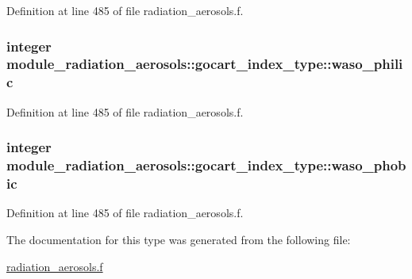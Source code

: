 Definition at line 485 of file radiation\+\_\+aerosols.\+f.

\subsubsection[{\texorpdfstring{waso\+\_\+philic}{waso_philic}}]{\setlength{\rightskip}{0pt plus 5cm}integer module\+\_\+radiation\+\_\+aerosols\+::gocart\+\_\+index\+\_\+type\+::waso\+\_\+philic\hspace{0.3cm}{\ttfamily [private]}}\hypertarget{structmodule__radiation__aerosols_1_1gocart__index__type_a05425c83c167f7820a126c72e561a4da}{}\label{structmodule__radiation__aerosols_1_1gocart__index__type_a05425c83c167f7820a126c72e561a4da}


Definition at line 485 of file radiation\+\_\+aerosols.\+f.

\subsubsection[{\texorpdfstring{waso\+\_\+phobic}{waso_phobic}}]{\setlength{\rightskip}{0pt plus 5cm}integer module\+\_\+radiation\+\_\+aerosols\+::gocart\+\_\+index\+\_\+type\+::waso\+\_\+phobic\hspace{0.3cm}{\ttfamily [private]}}\hypertarget{structmodule__radiation__aerosols_1_1gocart__index__type_a9975caaff0c49d25180699beb469601f}{}\label{structmodule__radiation__aerosols_1_1gocart__index__type_a9975caaff0c49d25180699beb469601f}


Definition at line 485 of file radiation\+\_\+aerosols.\+f.



The documentation for this type was generated from the following file\+:\begin{DoxyCompactItemize}
\item 
\hyperlink{radiation__aerosols_8f}{radiation\+\_\+aerosols.\+f}\end{DoxyCompactItemize}
